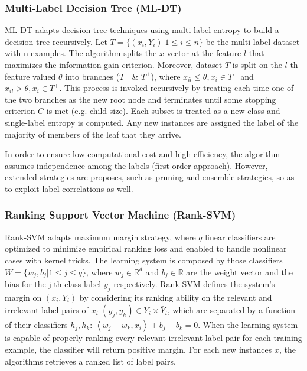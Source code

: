 \documentclass[12pt]{report}
\begin{document}
	\subsubsection*{Multi-Label Decision Tree (ML-DT)}
	ML-DT adapts decision tree techniques using multi-label entropy to build a decision tree recursively. Let $T = \{(x_i, Y_i) | 1 \leq i \leq n \}$ be the multi-label dataset with n examples. The algorithm splits the $x$ vector at the feature $l$ that maximizes the information gain criterion. Moreover, dataset $T$ is split on the $l$-th feature valued $\theta$ into branches ($T^-$ \& $T^+$), where $x_{il} \leq \theta, x_i \in T^-$ and $x_{il} > \theta, x_i \in T^+$. This process is invoked recursively by treating each time one of the two branches as the new root node and terminates until some stopping criterion $C$ is met (e.g. child size). Each subset is treated as a new class and single-label entropy is computed. Any new instances are assigned the label of the majority of members of the leaf that they arrive.
	
	In order to ensure low computational cost and high efficiency, the algorithm assumes independence among the labels (first-order approach). However, extended strategies are proposes, such as pruning and ensemble strategies, so as to exploit label correlations as well.
	
	\subsubsection*{Ranking Support Vector Machine (Rank-SVM)}
	Rank-SVM adapts maximum margin strategy, where $q$ linear classifiers are optimized to minimize empirical ranking loss and enabled to handle nonlinear cases with kernel tricks. The learning system is composed by those classifiers $W = \{w_j,b_j | 1 \leq j \leq q\}$, where $w_j \in \mathbb{R}^d$ and $b_j \in \mathbb{R}$ are the weight vector and the bias
	for the j-th class label $y_j$ respectively. Rank-SVM defines the system’s margin on $(x_i,Y_i)$ by considering its ranking ability on the relevant and irrelevant label pairs of $x_i$ $(y_j,y_k) \in Y_i \times \bar Y_i$, which are separated by a function of their classifiers $h_j, h_k$: $\left<w_j-w_k, x_i \right> + b_j - b_k=0$. When the learning system is capable of properly ranking every relevant-irrelevant label pair for each training example, the classifier will return positive margin. For each new instances $x$, the algorithms retrieves a ranked list of label pairs.
	
\end{document}

